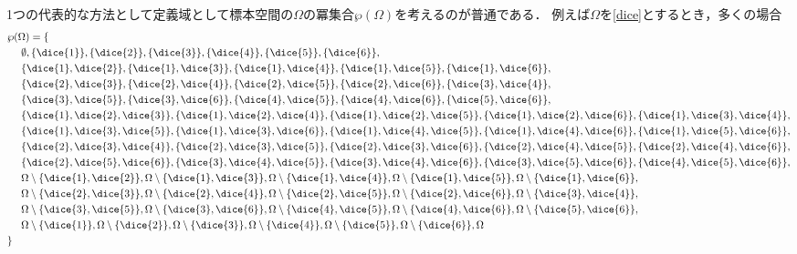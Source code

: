 \documentclass[main.tex]{subfiles}
\begin{document}
1つの代表的な方法として定義域として標本空間の\(\Omega\)の冪集合\(\wp(\Omega)\)を考えるのが普通である．
例えば\(\Omega\)を\eqref{dice}とするとき，多くの場合
\begin{align*}
    & \wp(\Omega) = \{ \\
    & \ \ \ \ \emptyset, \{\dice{1}\}, \{\dice{2}\}, \{\dice{3}\}, \{\dice{4}\}, \{\dice{5}\}, \{\dice{6}\}, \\
    & \ \ \ \ 
        \{\dice{1}, \dice{2}\},
        \{\dice{1}, \dice{3}\},
        \{\dice{1}, \dice{4}\},
        \{\dice{1}, \dice{5}\},
        \{\dice{1}, \dice{6}\}, \\
    & \ \ \ \ 
        \{\dice{2}, \dice{3}\},
        \{\dice{2}, \dice{4}\},
        \{\dice{2}, \dice{5}\},
        \{\dice{2}, \dice{6}\},
        \{\dice{3}, \dice{4}\}, \\
    & \ \ \ \ 
        \{\dice{3}, \dice{5}\},
        \{\dice{3}, \dice{6}\},
        \{\dice{4}, \dice{5}\},
        \{\dice{4}, \dice{6}\},
        \{\dice{5}, \dice{6}\}, \\
    & \ \ \ \ 
        \{\dice{1}, \dice{2}, \dice{3}\},
        \{\dice{1}, \dice{2}, \dice{4}\},
        \{\dice{1}, \dice{2}, \dice{5}\},
        \{\dice{1}, \dice{2}, \dice{6}\},
        \{\dice{1}, \dice{3}, \dice{4}\}, \\
    & \ \ \ \ 
        \{\dice{1}, \dice{3}, \dice{5}\},
        \{\dice{1}, \dice{3}, \dice{6}\},
        \{\dice{1}, \dice{4}, \dice{5}\},
        \{\dice{1}, \dice{4}, \dice{6}\},
        \{\dice{1}, \dice{5}, \dice{6}\}, \\
    & \ \ \ \ 
        \{\dice{2}, \dice{3}, \dice{4}\},
        \{\dice{2}, \dice{3}, \dice{5}\},
        \{\dice{2}, \dice{3}, \dice{6}\},
        \{\dice{2}, \dice{4}, \dice{5}\},
        \{\dice{2}, \dice{4}, \dice{6}\}, \\
    & \ \ \ \ 
        \{\dice{2}, \dice{5}, \dice{6}\},
        \{\dice{3}, \dice{4}, \dice{5}\},
        \{\dice{3}, \dice{4}, \dice{6}\},
        \{\dice{3}, \dice{5}, \dice{6}\},
        \{\dice{4}, \dice{5}, \dice{6}\}, \\
    & \ \ \ \ 
        \Omega \setminus \{\dice{1}, \dice{2}\},
        \Omega \setminus \{\dice{1}, \dice{3}\},
        \Omega \setminus \{\dice{1}, \dice{4}\},
        \Omega \setminus \{\dice{1}, \dice{5}\},
        \Omega \setminus \{\dice{1}, \dice{6}\}, \\
    & \ \ \ \ 
        \Omega \setminus \{\dice{2}, \dice{3}\},
        \Omega \setminus \{\dice{2}, \dice{4}\},
        \Omega \setminus \{\dice{2}, \dice{5}\},
        \Omega \setminus \{\dice{2}, \dice{6}\},
        \Omega \setminus \{\dice{3}, \dice{4}\}, \\
    & \ \ \ \ 
        \Omega \setminus \{\dice{3}, \dice{5}\},
        \Omega \setminus \{\dice{3}, \dice{6}\},
        \Omega \setminus \{\dice{4}, \dice{5}\},
        \Omega \setminus \{\dice{4}, \dice{6}\},
        \Omega \setminus \{\dice{5}, \dice{6}\}, \\
    & \ \ \ \  \Omega \setminus \{\dice{1}\}, \Omega \setminus \{\dice{2}\}, \Omega \setminus \{\dice{3}\}, \Omega \setminus \{\dice{4}\}, \Omega \setminus \{\dice{5}\}, \Omega \setminus \{\dice{6}\}, \Omega \\
    & \}
\end{align*}
\end{document}
